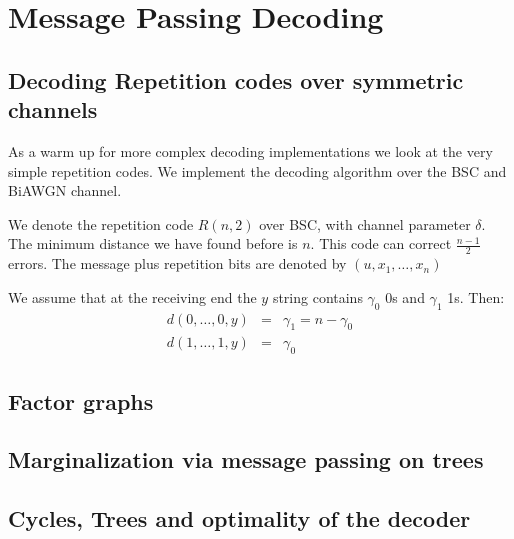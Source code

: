 \chapter{Message Passing Decoding}

\section{Decoding Repetition codes over symmetric channels}
As a warm up for more complex decoding implementations we look at the very simple repetition codes. We implement the decoding algorithm over the BSC and BiAWGN channel. 

We denote the repetition code $R(n, 2)$ over BSC, with channel parameter $\delta$. The minimum distance we have found before is $n$. This code can correct $\frac{n-1}{2}$ errors. The message plus repetition bits are denoted by $(u, x_1, \dots, x_n)$ 

We assume that at the receiving end the $y$ string contains $\gamma_0$ 0s and $\gamma_1$ 1s. Then:
\begin{eqnarray}
	d(0, \dots, 0, y) &=& \gamma_1  = n-\gamma_0 \\
	d(1, \dots, 1, y) &=& \gamma_0
\end{eqnarray}


\section{Factor graphs}

\section{Marginalization via message passing on trees}

\section{Cycles, Trees and optimality of the decoder}
